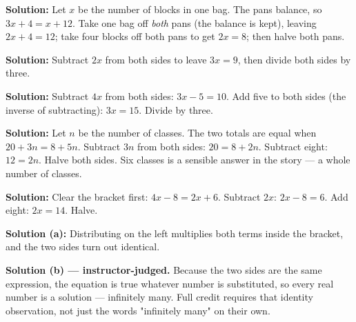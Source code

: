 \documentclass[12pt]{article}
\begin{document}




\textbf{Solution:} \quad Let $x$ be the number of blocks in one bag. The pans balance, so
$3x + 4 = x + 12$. Take one bag off \emph{both} pans (the balance is kept), leaving
$2x + 4 = 12$; take four blocks off both pans to get $2x = 8$; then halve both pans.


\textbf{Solution:} \quad Subtract $2x$ from both sides to leave $3x = 9$, then divide both
sides by three. 


\textbf{Solution:} \quad Subtract $4x$ from both sides: $3x - 5 = 10$. Add five to both
sides (the inverse of subtracting): $3x = 15$. Divide by three. 


\textbf{Solution:} \quad Let $n$ be the number of classes. The two totals are equal when
$20 + 3n = 8 + 5n$. Subtract $3n$ from both sides: $20 = 8 + 2n$. Subtract eight:
$12 = 2n$. Halve both sides. Six classes is a sensible answer in the story --- a whole
number of classes. 


\textbf{Solution:} \quad Clear the bracket first: $4x - 8 = 2x + 6$. Subtract $2x$:
$2x - 8 = 6$. Add eight: $2x = 14$. Halve. 


\textbf{Solution (a):} \quad Distributing on the left multiplies both terms inside the
bracket, and the two sides turn out identical. 

\textbf{Solution (b) --- instructor-judged.} \quad Because the two sides are the same
expression, the equation is true whatever number is substituted, so every real number is a
solution --- infinitely many. Full credit requires that identity observation, not just the
words "infinitely many" on their own.
\end{document}
